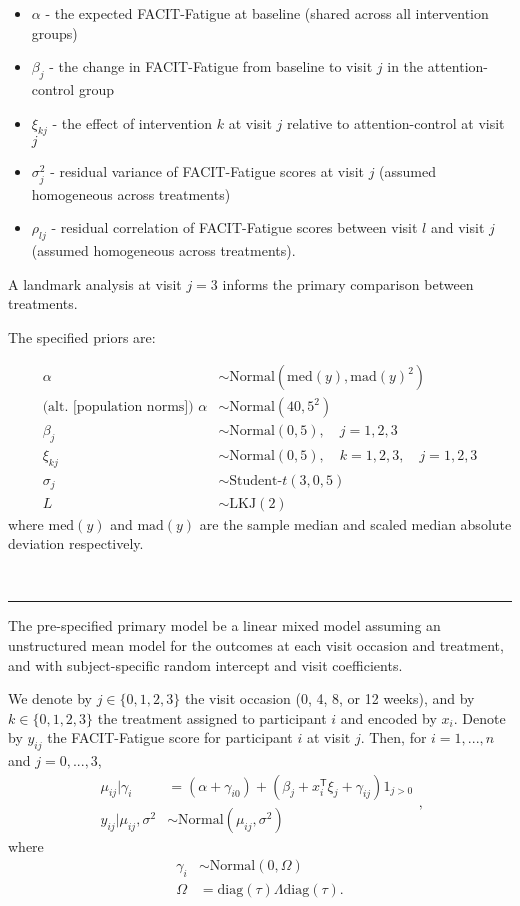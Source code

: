 \documentclass[
]{article}
\providecommand{\tightlist}{%
  \setlength{\itemsep}{0pt}\setlength{\parskip}{0pt}}
\begin{document}
\begin{itemize}
  \tightlist
  \item $\alpha$ - the expected FACIT-Fatigue at baseline (shared across all intervention groups)
  \item $\beta_j$ - the change in FACIT-Fatigue from baseline to visit $j$ in the attention-control group
  \item $\xi_{kj}$ - the effect of intervention $k$ at visit $j$ relative to attention-control at visit $j$
  \item $\sigma_j^2$ - residual variance of FACIT-Fatigue scores at visit $j$ (assumed homogeneous across treatments)
  \item $\rho_{lj}$ - residual correlation of FACIT-Fatigue scores between visit $l$ and visit $j$ (assumed homogeneous across treatments).
\end{itemize}
A landmark analysis at visit $j=3$ informs the primary comparison between treatments.


The specified priors are:

$$
\begin{aligned}
  \alpha &\sim \text{Normal}\left(\text{med}(y), \text{mad}(y)^2\right) \\
  \text{(alt. [population norms]) } \alpha &\sim \text{Normal}(40, 5^2) \\
  \beta_j &\sim \text{Normal}\left(0, 5\right),\quad j=1,2,3 \\
  \xi_{kj} &\sim \text{Normal}(0, 5),\quad k=1,2,3,\quad j=1,2,3 \\
  \sigma_j &\sim \text{Student-}t(3, 0, 5) \\
  L &\sim \text{LKJ}(2) 
\end{aligned}
$$
where $\text{med}(y)$ and $\text{mad}(y)$ are the sample median and scaled median absolute deviation respectively.

\
\hrule

The pre-specified primary model  be a linear mixed model assuming an unstructured mean model for the outcomes at each visit occasion and treatment, and with subject-specific random intercept and visit coefficients.

We denote by $j\in\{0,1,2,3\}$ the visit occasion (0, 4, 8, or 12 weeks), and by $k\in\{0,1,2,3\}$ the treatment assigned to participant $i$ and encoded by $x_i$.
Denote by $y_{ij}$ the FACIT-Fatigue score for participant $i$ at visit $j$.
Then, for $i=1,...,n$ and $j=0,...,3$,
$$
\begin{aligned}
\mu_{ij}|\gamma_i &= (\alpha+\gamma_{i0}) + (\beta_j + x_i^\mathsf{T}\xi_{j} + \gamma_{ij})1_{j>0} \\
y_{ij}|\mu_{ij},\sigma^2 &\sim \text{Normal}\left(\mu_{ij}, \sigma^2\right)
\end{aligned},
$$
where
$$
\begin{aligned}
  \gamma_i &\sim \text{Normal}\left(0, \Omega\right) \\
  \Omega &= \text{diag}(\tau)\Lambda\text{diag}(\tau).
\end{aligned}
$$
\end{document}
